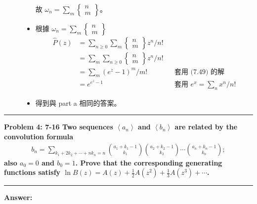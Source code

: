 \documentclass[11pt,fleqn]{article}
\newcommand\question[2]{\vspace{.25in}\hrule\textbf{#1: #2}\vspace{.5em}\hrule\vspace{.10in}}
\renewcommand\part[1]{\vspace{.10in}\textbf{#1}}
\begin{document}
\begin{description}
\begin{itemize}
				故 $\omega_n = \sum_m \begin{Bmatrix}n\\m\end{Bmatrix}$。
			\item 根據 $\omega_n = \sum_m \begin{Bmatrix}n\\m\end{Bmatrix}$
				\begin{align*}
					\widehat{P}(z) &= \sum_{n \ge 0} \sum_m \begin{Bmatrix}n\\m\end{Bmatrix}
						z^n / n! \\
					&= \sum_m \sum_{n \ge 0} \begin{Bmatrix}n\\m\end{Bmatrix} z^n / n! \\
					&= \sum_m (e^z-1)^m / m! 
						&& \text{套用 (7.49) 的解}\\
					&= e^{e^z-1}
						&& \text{套用 } e^x = \sum_n x^n / n!
				\end{align*}
			\item 得到與 part a 相同的答案。
		\end{itemize}
\end{description}

\newpage

\question{Problem 4} {7-16 Two sequences $\left \langle a_n \right \rangle$ and 
	$\left \langle  b_n \right \rangle$ are related by the convolution formula
	\begin{align*}
		b_n = \sum_{k_1 + 2k_2 + \cdots + n k_n = n} \binom{a_1+k_1-1}{k_1}
				\binom{a_2+k_2-1}{k_2} \cdots \binom{a_n+k_n-1}{k_n};
	\end{align*}
	also $a_0 = 0$ and $b_0 = 1$. Prove that the corresponding generating functions
	satisfy $\ln B(z) = A(z) + \frac{1}{2} A(z^2) + \frac{1}{3} A(z^3) + \cdots$.
}

\part{Answer:}
\end{document}
